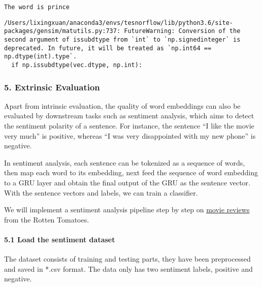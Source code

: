 \documentclass[11pt]{article}
\begin{document}
    \begin{Verbatim}[commandchars=\\\{\}]
The word is prince

    \end{Verbatim}

    \begin{Verbatim}[commandchars=\\\{\}]
/Users/lixingxuan/anaconda3/envs/tesnorflow/lib/python3.6/site-packages/gensim/matutils.py:737: FutureWarning: Conversion of the second argument of issubdtype from `int` to `np.signedinteger` is deprecated. In future, it will be treated as `np.int64 == np.dtype(int).type`.
  if np.issubdtype(vec.dtype, np.int):

    \end{Verbatim}

    \hypertarget{extrinsic-evaluation}{%
\subsubsection{5. Extrinsic Evaluation}\label{extrinsic-evaluation}}

Apart from intrinsic evaluation, the quality of word embeddings can also
be evaluated by downstream tasks such as sentiment analysis, which aims
to detect the sentiment polarity of a sentence. For instance, the
sentence ``I like the movie very much'' is positive, whereas ``I was
very disappointed with my new phone'' is negative.

In sentiment analysis, each sentence can be tokenized as a sequence of
words, then map each word to its embedding, next feed the sequence of
word embedding to a GRU layer and obtain the final output of the GRU as
the sentence vector. With the sentence vectors and labels, we can train
a classifier.

We will implement a sentiment analysis pipeline step by step on
\href{https://www.kaggle.com/c/sentiment-analysis-on-movie-reviews/data}{movie
reviews} from the Rotten Tomatoes.

    \hypertarget{load-the-sentiment-dataset}{%
\paragraph{5.1 Load the sentiment
dataset}\label{load-the-sentiment-dataset}}

The dataset consists of training and testing parts, they have been
preprocessed and saved in *.csv format. The data only has two sentiment
labels, positive and negative.
\end{document}
